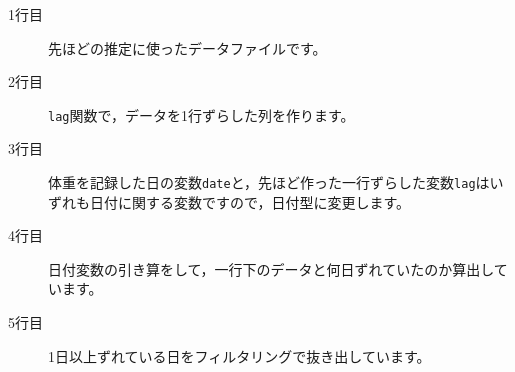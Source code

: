\begin{description}
	\item[1行目] 先ほどの推定に使ったデータファイルです。
	\item[2行目] \verb|lag|関数で，データを1行ずらした列を作ります。
	\item[3行目] 体重を記録した日の変数\verb|date|と，先ほど作った一行ずらした変数\verb|lag|はいずれも日付に関する変数ですので，日付型に変更します。
	\item[4行目] 日付変数の引き算をして，一行下のデータと何日ずれていたのか算出しています。
	\item[5行目] 1日以上ずれている日をフィルタリングで抜き出しています。
\end{description}
